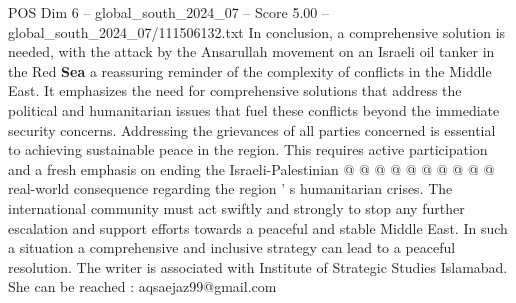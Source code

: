 \begin{textsample}{POS Dim 6 – global\_south\_2024\_07 – Score 5.00 – global\_south\_2024\_07/111506132.txt}
In conclusion, a comprehensive solution is needed, with the attack by the Ansarullah movement on an Israeli oil tanker in the Red \textbf{Sea} a reassuring reminder of the complexity of conflicts in the Middle East.
It emphasizes the need for comprehensive solutions that address the political and humanitarian issues that fuel these conflicts beyond the immediate security concerns.
Addressing the grievances of all parties concerned is essential to achieving sustainable peace in the region.
This requires active participation and a fresh emphasis on ending the Israeli-Palestinian @ @ @ @ @ @ @ @ @ @ real-world consequence regarding the region ' s humanitarian crises.
The international community must act swiftly and strongly to stop any further escalation and support efforts towards a peaceful and stable Middle East.
In such a situation a comprehensive and inclusive strategy can lead to a peaceful resolution.
The writer is associated with Institute of Strategic Studies Islamabad.
She can be reached : aqsaejaz99@gmail.com

\end{textsample}
